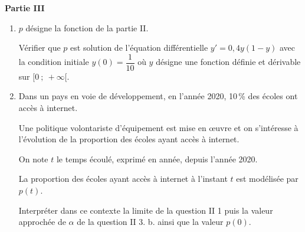 \bigskip

\textbf{Partie III}

\medskip

\begin{enumerate}
\item $p$ désigne la fonction de la partie II.

Vérifier que $p$ est solution de l'équation différentielle $y' = 0,4y(1 - y)$ avec la condition initiale 
$y(0) = \dfrac{1}{10}$ où $y$ désigne une fonction définie et dérivable sur $[0~;~ + \infty[$.
\item Dans un pays en voie de développement, en l'année 2020, 10\,\% des écoles ont accès à internet. 

Une politique volontariste d'équipement est mise en œuvre et on s'intéresse à l'évolution de la proportion des écoles ayant accès à internet. 

On note $t$ le temps écoulé, exprimé en année, depuis l'année 2020.

La proportion des écoles ayant accès à internet à l'instant $t$ est modélisée par $p(t)$.

Interpréter dans ce contexte la limite de la question II 1 puis la valeur approchée de $\alpha$ de la question II 3. b. ainsi que la valeur $p(0)$.
\end{enumerate}

